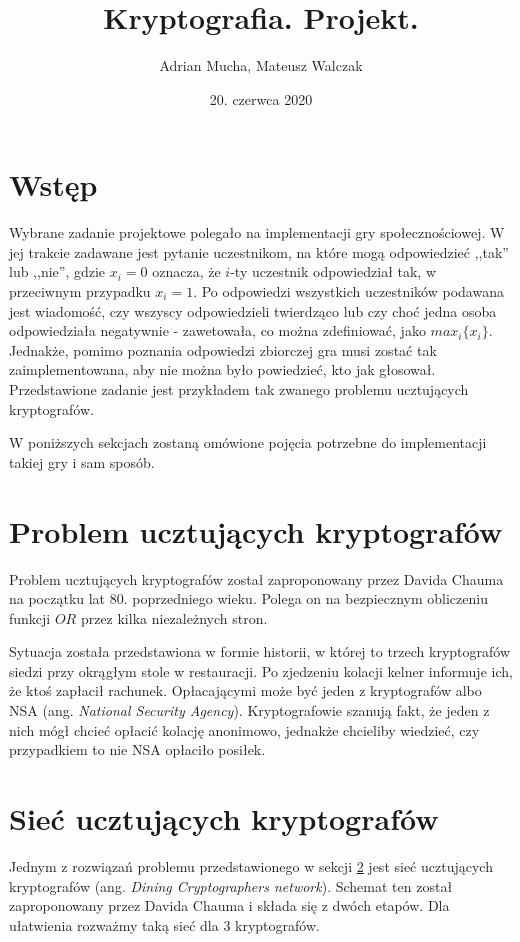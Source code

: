 \documentclass[a4paper]{article}
\title{Kryptografia. Projekt.}
\author{Adrian Mucha, Mateusz Walczak}
\date{20. czerwca 2020}
\begin{document}
\maketitle

\section{Wstęp}
Wybrane zadanie projektowe polegało na implementacji gry społecznościowej. W jej trakcie zadawane jest pytanie uczestnikom, na które mogą odpowiedzieć ,,tak'' lub ,,nie'', gdzie $x_i = 0$ oznacza, że $i$-ty uczestnik odpowiedział tak, w przeciwnym przypadku $x_i = 1$. Po odpowiedzi wszystkich uczestników podawana jest wiadomość, czy wszyscy odpowiedzieli twierdząco lub czy choć jedna osoba odpowiedziała negatywnie - zawetowała, co można zdefiniować, jako $max_i\{x_i\}$. Jednakże, pomimo poznania odpowiedzi zbiorczej gra musi zostać tak zaimplementowana, aby nie można było powiedzieć, kto jak głosował. Przedstawione zadanie jest przykładem tak zwanego problemu ucztujących kryptografów.

W poniższych sekcjach zostaną omówione pojęcia potrzebne do implementacji takiej gry i sam sposób.

\section{Problem ucztujących kryptografów} \label{section:dcProblem}
Problem ucztujących kryptografów został zaproponowany przez Davida Chauma na początku lat 80. poprzedniego wieku. Polega on na bezpiecznym obliczeniu funkcji $OR$ przez kilka niezależnych stron. 

Sytuacja została przedstawiona w formie historii, w której to trzech kryptografów siedzi przy okrągłym stole w restauracji. Po zjedzeniu kolacji kelner informuje ich, że ktoś zapłacił rachunek. Opłacającymi może być jeden z kryptografów albo NSA (ang. \textit{National Security Agency}). Kryptografowie szanują fakt, że jeden z nich mógł chcieć opłacić kolację anonimowo, jednakże chcieliby wiedzieć, czy przypadkiem to nie NSA opłaciło posiłek. 

\section{Sieć ucztujących kryptografów} \label{section:dcNetwork}
Jednym z rozwiązań problemu przedstawionego w sekcji \ref{section:dcProblem} jest sieć ucztujących kryptografów (ang. \textit{Dining Cryptographers network}). Schemat ten został zaproponowany przez Davida Chauma i składa się z dwóch etapów. Dla ułatwienia rozważmy taką sieć dla $3$ kryptografów.
\end{document}
